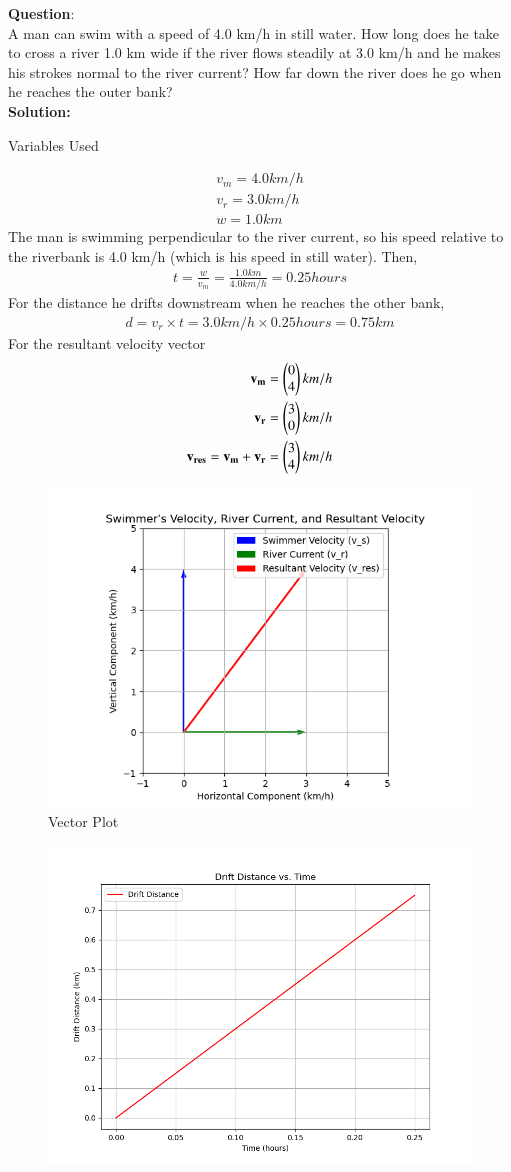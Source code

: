 \documentclass[journal]{IEEEtran}
\begin{document}
\textbf{Question}:\\
A man can swim with a speed of 4.0 km/h in still water. How long does he take to cross a river 1.0 km wide if the river flows steadily at 3.0 km/h and he makes his strokes normal to the river current? How far down the river does he go when he reaches the outer bank? \\
\textbf{Solution: }
\begin{table}[h!]    
  \centering
  
  \caption{Variables Used}
  \label{tab 1.2.26.1}
\end{table}
\begin{align}
	v_{m} = 4.0 km/h \\
	v_{r} = 3.0 km/h \\
	w = 1.0 km
\end{align}
The man is swimming perpendicular to the river current, so his speed relative to the riverbank is 4.0 km/h (which is his speed in still water). Then,
\begin{align}
	t = \frac{w}{v_{m}} = \frac{1.0 km}{4.0 km/h} = 0.25 hours
\end{align}
For the distance he drifts downstream when he reaches the other bank,
\begin{align}
	d = v_{r} \times t = 3.0 km/h \times 0.25 hours = 0.75 km
\end{align}
For the resultant velocity vector
\begin{align}
	\mathbf{v_{m}}=\begin{pmatrix}0 \\ 4\end{pmatrix} km/h \\
	\mathbf{v_{r}}=\begin{pmatrix}3 \\ 0\end{pmatrix} km/h \\
	\mathbf{v_{res}}=\mathbf{v_{m}}+\mathbf{v_{r}}=\begin{pmatrix} 3 \\ 4\end{pmatrix} km/h
\end{align}
\begin{figure}[h!]
   \centering
   \includegraphics[width=0.7\linewidth]{figures/Figure_1.png}
   \caption{Vector Plot}
   \label{vector}
\end{figure}
\begin{figure}[h!]
   \centering
   \includegraphics[width=0.7\linewidth]{figures/Figure_2.png}
   \label{graph}
\end{figure}
\end{document}
